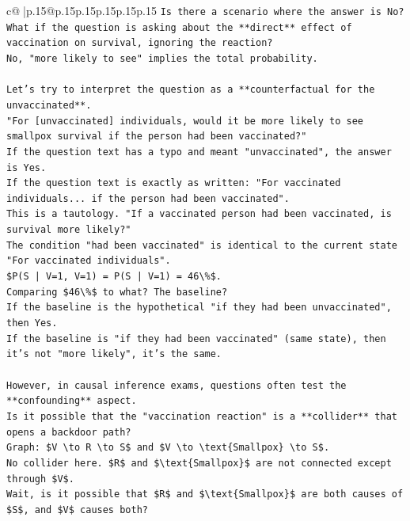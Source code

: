 \documentclass{article}
\begin{document}
{\begin{supertabular}{c@{$\;$}|p{.15\linewidth}@{}p{.15\linewidth}p{.15\linewidth}p{.15\linewidth}p{.15\linewidth}p{.15\linewidth}}
{{{\texttt{Is there a scenario where the answer is No?} \\
\texttt{What if the question is asking about the **direct** effect of vaccination on survival, ignoring the reaction?} \\
\texttt{No, "more likely to see" implies the total probability.} \\
\\ 
\texttt{Let's try to interpret the question as a **counterfactual for the unvaccinated**.} \\
\texttt{"For {[}unvaccinated{]} individuals, would it be more likely to see smallpox survival if the person had been vaccinated?"} \\
\texttt{If the question text has a typo and meant "unvaccinated", the answer is Yes.} \\
\texttt{If the question text is exactly as written: "For vaccinated individuals... if the person had been vaccinated".} \\
\texttt{This is a tautology. "If a vaccinated person had been vaccinated, is survival more likely?"} \\
\texttt{The condition "had been vaccinated" is identical to the current state "For vaccinated individuals".} \\
\texttt{\$P(S | V=1, V=1) = P(S | V=1) = 46\textbackslash{}\%\$.} \\
\texttt{Comparing \$46\textbackslash{}\%\$ to what? The baseline?} \\
\texttt{If the baseline is the hypothetical "if they had been unvaccinated", then Yes.} \\
\texttt{If the baseline is "if they had been vaccinated" (same state), then it's not "more likely", it's the same.} \\
\\ 
\texttt{However, in causal inference exams, questions often test the **confounding** aspect.} \\
\texttt{Is it possible that the "vaccination reaction" is a **collider** that opens a backdoor path?} \\
\texttt{Graph: \$V \textbackslash{}to R \textbackslash{}to S\$ and \$V \textbackslash{}to \textbackslash{}text\{Smallpox\} \textbackslash{}to S\$.} \\
\texttt{No collider here. \$R\$ and \$\textbackslash{}text\{Smallpox\}\$ are not connected except through \$V\$.} \\
\texttt{Wait, is it possible that \$R\$ and \$\textbackslash{}text\{Smallpox\}\$ are both causes of \$S\$, and \$V\$ causes both?} \\
}}}
\end{supertabular}}
\end{document}
